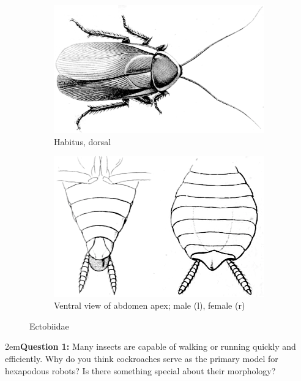 \documentclass[letterpaper, 11pt]{article}
\begin{document}
\begin{figure}[ht!]
    \centering
    \begin{subfigure}[ht!]{0.45\textwidth}
        \includegraphics[width=\textwidth]{EctobiidHabitus}
        \caption{Habitus, dorsal \citep[][Plate III, Fig. 14A]{bhl26431}}
        \label{fig:ectobiidhabitus}
    \end{subfigure}
    \qquad
    \begin{subfigure}[ht!]{0.45\textwidth}
        \includegraphics[width=\textwidth]{EctobiidAbdomen}
        \caption{Ventral view of abdomen apex; male (l), female (r) \citep[Plate II, Fig. 7E,D']{bhl26431}}
        \label{fig:ectobiidgenit}
    \end{subfigure}
    \caption{Ectobiidae}\label{fig:ectobiidae}
\end{figure}

\hangindent2em\textbf{Question 1:} Many insects are capable of walking or running quickly and efficiently. Why do you think cockroaches serve as the primary model for hexapodous robots? Is there something special about their morphology?\\
\end{document}

